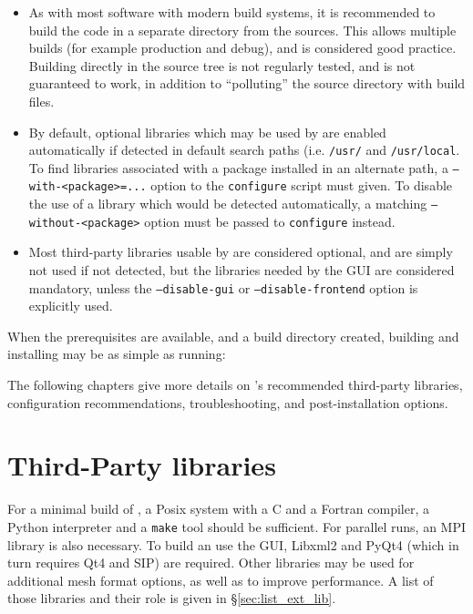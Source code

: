 \documentclass[a4paper,10pt,twoside]{csshortdoc}
\begin{document}
\begin{itemize}
\item As with most software with modern build systems, it is recommended
      to build the code in a separate directory from the sources. This
      allows multiple builds (for example production and debug), and is
      considered good practice. Building directly in the source tree is
      not regularly tested, and is not guaranteed to work, in addition
      to ``polluting'' the source directory with build files.
\item By default, optional libraries which may be used by \CS are
      enabled automatically if detected in default search paths
      (i.e. \texttt{/usr/} and \texttt{/usr/local}. To find libraries
      associated with a package installed in an alternate path,
      a \texttt{--with-<package>=...} option to the \texttt{configure} script
      must given. To disable the use of a library which would be
      detected automatically, a matching \texttt{--without-<package>} option
      must be passed to \texttt{configure} instead.
\item Most third-party libraries usable by \CS are considered optional,
      and are simply not used if not detected, but the libraries needed by
      the GUI are considered mandatory, unless the \texttt{--disable-gui}
      or \texttt{--disable-frontend} option is explicitly used.
\end{itemize}

When the prerequisites are available, and a build directory
created, building and installing \CS may be as simple as running:


The following chapters give more details on \CS's recommended
third-party libraries, configuration recommendations, troubleshooting,
and post-installation options.

\section{Third-Party libraries\label{sec:ext_lib}}

For a minimal build of \CS, a Posix system with a C and a Fortran compiler,
a Python interpreter and a {\tt make} tool should be sufficient.
For parallel runs, an MPI library is also necessary.
To build an use the GUI, Libxml2 and PyQt4 (which in turn requires
Qt4 and SIP) are required.
Other libraries may be used for additional mesh format options,
as well as to improve performance. A list of those libraries
and their role is given in \S\ref{sec:list_ext_lib}.
\end{document}

